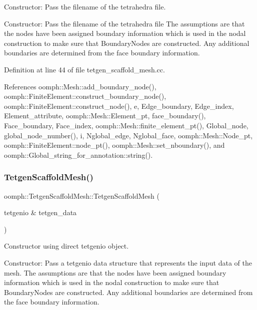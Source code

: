 Constructor\+: Pass the filename of the tetrahedra file. 

Constructor\+: Pass the filename of the tetrahedra file The assumptions are that the nodes have been assigned boundary information which is used in the nodal construction to make sure that Boundary\+Nodes are constructed. Any additional boundaries are determined from the face boundary information. 

Definition at line 44 of file tetgen\+\_\+scaffold\+\_\+mesh.\+cc.



References oomph\+::\+Mesh\+::add\+\_\+boundary\+\_\+node(), oomph\+::\+Finite\+Element\+::construct\+\_\+boundary\+\_\+node(), oomph\+::\+Finite\+Element\+::construct\+\_\+node(), e, Edge\+\_\+boundary, Edge\+\_\+index, Element\+\_\+attribute, oomph\+::\+Mesh\+::\+Element\+\_\+pt, face\+\_\+boundary(), Face\+\_\+boundary, Face\+\_\+index, oomph\+::\+Mesh\+::finite\+\_\+element\+\_\+pt(), Global\+\_\+node, global\+\_\+node\+\_\+number(), i, Nglobal\+\_\+edge, Nglobal\+\_\+face, oomph\+::\+Mesh\+::\+Node\+\_\+pt, oomph\+::\+Finite\+Element\+::node\+\_\+pt(), oomph\+::\+Mesh\+::set\+\_\+nboundary(), and oomph\+::\+Global\+\_\+string\+\_\+for\+\_\+annotation\+::string().

\mbox{\label{classoomph_1_1TetgenScaffoldMesh_aaafa633cb5bb15366edcfe49804b5f6f}} 
\subsubsection{\texorpdfstring{Tetgen\+Scaffold\+Mesh()}{TetgenScaffoldMesh()}\hspace{0.1cm}{\footnotesize\ttfamily [3/3]}}
{\footnotesize\ttfamily oomph\+::\+Tetgen\+Scaffold\+Mesh\+::\+Tetgen\+Scaffold\+Mesh (\begin{DoxyParamCaption}\item[{tetgenio \&}]{tetgen\+\_\+data }\end{DoxyParamCaption})}



Constructor using direct tetgenio object. 

Constructor\+: Pass a tetgenio data structure that represents the input data of the mesh. The assumptions are that the nodes have been assigned boundary information which is used in the nodal construction to make sure that Boundary\+Nodes are constructed. Any additional boundaries are determined from the face boundary information. 


